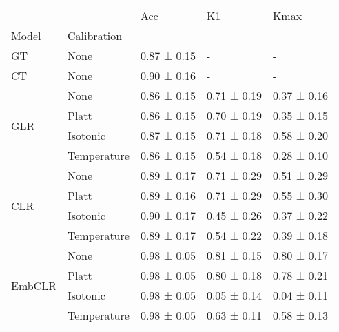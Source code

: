 \begin{tabular}{lllll}
\toprule
 &  & Acc & K1 & Kmax \\
Model & Calibration &  &  &  \\
\midrule
GT & None & 0.87 ± 0.15 & - & - \\
\cline{1-5}
CT & None & 0.90 ± 0.16 & - & - \\
\cline{1-5}
\multirow[t]{4}{*}{GLR} & None & 0.86 ± 0.15 & 0.71 ± 0.19 & 0.37 ± 0.16 \\
 & Platt & 0.86 ± 0.15 & 0.70 ± 0.19 & 0.35 ± 0.15 \\
 & Isotonic & 0.87 ± 0.15 & 0.71 ± 0.18 & 0.58 ± 0.20 \\
 & Temperature & 0.86 ± 0.15 & 0.54 ± 0.18 & 0.28 ± 0.10 \\
\cline{1-5}
\multirow[t]{4}{*}{CLR} & None & 0.89 ± 0.17 & 0.71 ± 0.29 & 0.51 ± 0.29 \\
 & Platt & 0.89 ± 0.16 & 0.71 ± 0.29 & 0.55 ± 0.30 \\
 & Isotonic & 0.90 ± 0.17 & 0.45 ± 0.26 & 0.37 ± 0.22 \\
 & Temperature & 0.89 ± 0.17 & 0.54 ± 0.22 & 0.39 ± 0.18 \\
\cline{1-5}
\multirow[t]{4}{*}{EmbCLR} & None & 0.98 ± 0.05 & 0.81 ± 0.15 & 0.80 ± 0.17 \\
 & Platt & 0.98 ± 0.05 & 0.80 ± 0.18 & 0.78 ± 0.21 \\
 & Isotonic & 0.98 ± 0.05 & 0.05 ± 0.14 & 0.04 ± 0.11 \\
 & Temperature & 0.98 ± 0.05 & 0.63 ± 0.11 & 0.58 ± 0.13 \\
\cline{1-5}
\bottomrule
\end{tabular}
